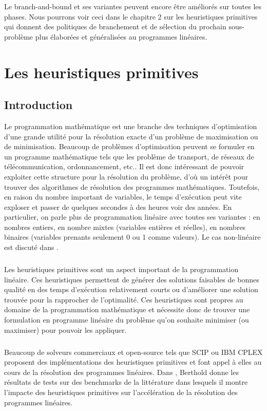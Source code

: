 \documentclass[12pt,a4paper,oneside]{book}
\theoremstyle{definition}
\begin{document}
    Le branch-and-bound et ses variantes peuvent encore être améliorés sur toutes les phases. Nous pourrons voir ceci dans le chapitre 2 sur les heuristiques primitives qui donnent des politiques de branchement et de sélection du prochain sous-problème plus élaborées et généralisées au programmes linéaires.   


	\chapter{Les heuristiques primitives}
	
	\section{Introduction}
	Le programmation mathématique est une branche des techniques d’optimisation d’une grande utilité pour la résolution exacte d’un problème de maximisation ou de minimisation.  Beaucoup de problèmes d’optimisation peuvent se formuler en un programme mathématique tels que les problème de transport, de réseaux de télécommunication, ordonnancement, etc.\cite{Gamrath2015}. Il est donc intéressant de pouvoir exploiter cette structure pour la résolution du problème, d’où un intérêt pour trouver des algorithmes de résolution des programmes mathématiques. Toutefois, en raison du nombre important de variables, le temps d’exécution peut vite exploser et passer de quelques secondes à des heures voir des années. En particulier, on parle plus de programmation linéaire avec toutes ses variantes : en nombres entiers, en nombre mixtes (variables entières et réelles), en nombres binaires (variables prenants seulement 0 ou 1 comme valeurs). Le cas non-linéaire est discuté dans \cite{berthold2014heuristic}.
	
	\paragraph{}
	Les heuristiques primitives sont un aspect important de la programmation linéaire. Ces heuristiques permettent de générer des solutions faisables de bonnes qualité en des temps d’exécution relativement courts ou d’améliorer une solution trouvée pour la rapprocher de l’optimalité. Ces heuristiques sont propres au domaine de la programmation mathématique et nécessite donc de trouver une formulation en programme linéaire du problème qu’on souhaite minimiser (ou maximiser) pour pouvoir les appliquer. 
	
	\paragraph{}
	Beaucoup de solveurs commerciaux et open-source tels que SCIP ou IBM CPLEX proposent des implémentations des heuristiques primitives et font appel à elles au cours de la résolution des programmes linéaires. Dans \cite{Berthold2018}, Berthold donne les résultats de tests sur des benchmarks de la littérature dans lesquels il montre l’impacte des heuristiques  primitives sur l’accélération de la résolution des programmes linéaires. 
	
\end{document}
